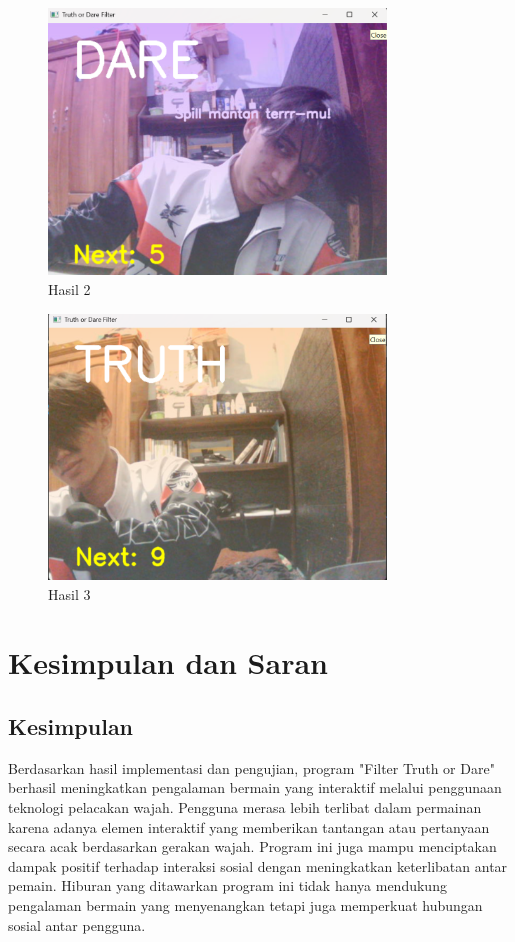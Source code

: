 \documentclass[11pt,a4paper]{article}
\begin{document}
\begin{figure}[H]
    \centering
    \includegraphics[width=0.8\textwidth]{12.png} %
    \caption{Hasil 2}
    \label{fig:12}
\end{figure}

\begin{figure}[H]
    \centering
    \includegraphics[width=0.8\textwidth]{13.png} %
    \caption{Hasil 3}
    \label{fig:13}
\end{figure}

\newpage
\section{Kesimpulan dan Saran}
\subsection{Kesimpulan}
Berdasarkan hasil implementasi dan pengujian, program "Filter Truth or Dare" berhasil meningkatkan pengalaman bermain yang interaktif melalui penggunaan teknologi pelacakan wajah. Pengguna merasa lebih terlibat dalam permainan karena adanya elemen interaktif yang memberikan tantangan atau pertanyaan secara acak berdasarkan gerakan wajah. Program ini juga mampu menciptakan dampak positif terhadap interaksi sosial dengan meningkatkan keterlibatan antar pemain. Hiburan yang ditawarkan program ini tidak hanya mendukung pengalaman bermain yang menyenangkan tetapi juga memperkuat hubungan sosial antar pengguna.
\end{document}
